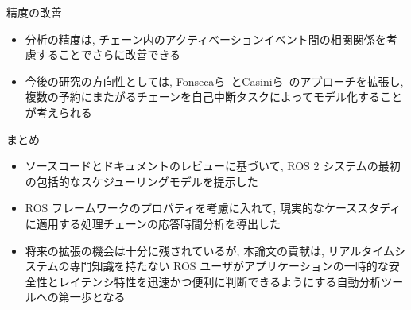 \begin{frame}{精度の改善}
    \begin{itemize}
        \item 分析の精度は, チェーン内のアクティベーションイベント間の相関関係を考慮することでさらに改善できる
        \item 今後の研究の方向性としては, Fonsecaら~\cite{fonseca2016response}とCasiniら~\cite{casini2018partitioned}のアプローチを拡張し, 複数の予約にまたがるチェーンを自己中断タスクによってモデル化することが考えられる
    \end{itemize}
\end{frame}

\begin{frame}{まとめ}
    \begin{itemize}
        \item ソースコードとドキュメントのレビューに基づいて, ROS 2 システムの最初の包括的なスケジューリングモデルを提示した
        \item ROS フレームワークのプロパティを考慮に入れて, 現実的なケーススタディに適用する処理チェーンの応答時間分析を導出した
        \item 将来の拡張の機会は十分に残されているが, 本論文の貢献は, リアルタイムシステムの専門知識を持たない ROS ユーザがアプリケーションの一時的な安全性とレイテンシ特性を迅速かつ便利に判断できるようにする自動分析ツールへの第一歩となる
    \end{itemize}
\end{frame}
